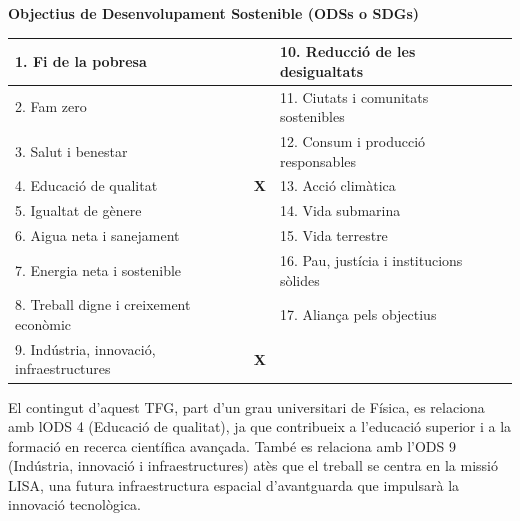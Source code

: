 \documentclass[twocolumn]{revtex4-2}
\begin{document}
\begin{center}
\textbf{Objectius de Desenvolupament Sostenible (ODSs o SDGs)}
\end{center}


\begin{center}
    \small
    \renewcommand{\arraystretch}{1.2}
  
    \begin{tabular}{|l|c|l|c|}
        \hline
        1. Fi de la pobresa & & 10. Reducció de les desigualtats & \\ \hline
        2. Fam zero & & 11. Ciutats i comunitats sostenibles & \\ \hline
        3. Salut i benestar & & 12. Consum i producció responsables & \\ \hline
        4. Educació de qualitat & \textbf{X} & 13. Acció climàtica & \\ \hline
        5. Igualtat de gènere & & 14. Vida submarina & \\ \hline
        6. Aigua neta i sanejament & & 15. Vida terrestre & \\ \hline
        7. Energia neta i sostenible & & 16. Pau, justícia i institucions sòlides & \\ \hline
        8. Treball digne i creixement econòmic & & 17. Aliança pels objectius & \\ \hline
        9. Indústria, innovació, infraestructures & \textbf{X} & & \\ \hline
    \end{tabular}
\end{center}

\vspace{0.2cm}

\noindent El contingut d'aquest TFG, part d'un grau universitari de Física, es relaciona amb lODS 4 (Educació de qualitat), ja que contribueix a l'educació superior i a la formació en recerca científica avançada. També es relaciona amb l'ODS 9 (Indústria, innovació i infraestructures) atès que el treball se centra en la missió LISA, una futura infraestructura espacial d'avantguarda que impulsarà la innovació tecnològica.

\vspace{0.5cm}

\end{document}
